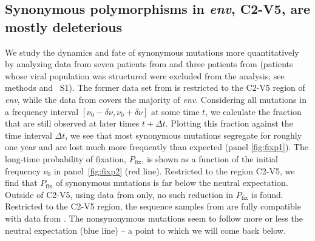 \documentclass[rmp, twocolumn]{revtex4}
\newcommand{\pfix}{P_{\mathrm{fix}}}
\newcommand{\env}{\textit{env}}
\newcommand{\shankaregion}{C2-V5}
\newcommand{\PCApat}{1}
\begin{document}
\subsection{Synonymous polymorphisms in \env, \shankaregion, are mostly deleterious}
We study the dynamics and fate of synonymous mutations more quantitatively by
analyzing data from seven patients from
\citet{shankarappa_consistent_1999,liu_selection_2006} and three patients from
\citet{bunnik_autologous_2008} (patients whose viral population was structured
were excluded from the analysis; see methods and \figurename~S\PCApat).  The
former data set from is restricted to the \shankaregion{} region of \env, while
the data from \citet{bunnik_autologous_2008} covers the majority of \env.
Considering all mutations in a frequency interval $[\nu_0-\delta\nu, \nu_0+\delta\nu]$ at some time
$t$, we calculate the fraction that are still observed at later times $t+\Delta t$. Plotting this fraction against the time interval $\Delta t$, we see that
most synonymous mutations segregate for roughly one year and are lost much more
frequently than expected (panel \ref{fig:fixp1}). The long-time probability of
fixation, $\pfix$, is shown as a function of the
initial frequency $\nu_0$ in panel~\ref{fig:fixp2} (red line). Restricted to the
region \shankaregion, we find that $\pfix$ of synonymous mutations is far below
the neutral expectation.  Outside of \shankaregion, using data from
\citet{bunnik_autologous_2008} only, no such reduction in $\pfix$ is found.
Restricted to the \shankaregion{} region, the sequence samples from
\citet{bunnik_autologous_2008} are fully compatible with data from
\citet{shankarappa_consistent_1999}. The nonsynonymous mutations seem to follow
more or less the neutral expectation (blue line) -- a point to which we will
come back below.
\end{document}
